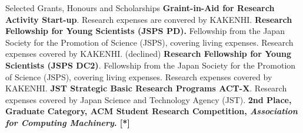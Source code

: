 \begin{rubric}{Selected Grants, Honours and Scholarships}
  \entry*[2024] \textbf{Graint-in-Aid for Research Activity Start-up}. Research expenses are convered by KAKENHI.
  \entry*[2023] \textbf{Research Fellowship for Young Scientists (JSPS PD).}
  Fellowship from the Japan Society for the Promotion of Science (JSPS), covering
  living expenses. Research expenses covered by KAKENHI. (declined)
  \entry*[2021] \textbf{Research Fellowship for Young Scientists (JSPS DC2)}.
  Fellowship from the Japan Society for the Promotion of Science (JSPS), covering
  living expenses. Research expenses covered by KAKENHI.
  \entry*[2020] \textbf{JST Strategic Basic Research Programs ACT-X}. Research
  expenses covered by Japan Science and Technology Agency (JST).
  \entry*[2019] \textbf{2nd Place, Graduate Category, ACM Student Research
    Competition, \textit{Association for Computing Machinery}. [*]}
\end{rubric}
